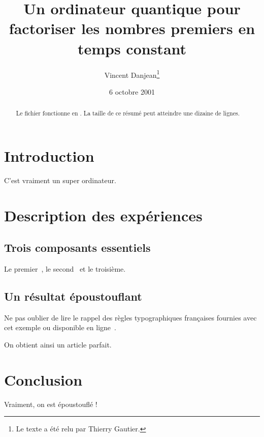 \documentclass[parallelisme]{compas2016}
\begin{document}
\title{Un ordinateur quantique pour factoriser les nombres premiers en
  temps constant}

\author{Vincent Danjean\thanks{Le texte a été relu par Thierry Gautier.}}%

\address{Université Joseph Fourrier,\\
Laboratoire LIG - Bâtiment ENSIMAG de Montbonnot - 51 avenue Jean Kuntzmann\\
38330 Montbonnot Saint Martin - France\\
Vincent.Danjean@imag.fr}

\date{6 octobre 2001}

\maketitle

\begin{abstract}
  Le fichier fonctionne en \LaTeXe. La taille
  de ce résumé peut atteindre une dizaine de lignes.
\end{abstract}

	
\section{Introduction}

C'est vraiment un super ordinateur.

\section{Description des expériences}

\subsection{Trois composants essentiels}

Le premier~\cite{BOTS,Quark}, le second~\cite{kaapi} et le troisième.

\subsection{Un résultat époustouflant}

Ne pas oublier de lire le rappel des règles typographiques françaises fournies avec cet exemple ou disponible en ligne~\cite{plasmachap}.

\medskip

On obtient ainsi un article parfait.

\section{Conclusion}
Vraiment, on est époustouflé !


\end{document}
